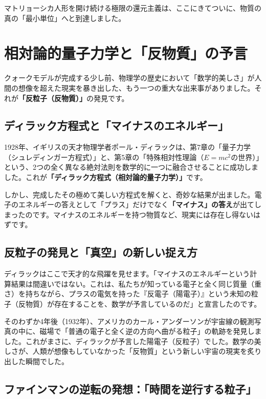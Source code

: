 マトリョーシカ人形を開け続ける極限の還元主義は、ここにきてついに、物質の真の「最小単位」へと到達しました。

\section{相対論的量子力学と「反物質」の予言}

クォークモデルが完成する少し前、物理学の歴史において「数学的美しさ」が人間の想像を超えた現実を暴き出した、もう一つの重大な出来事がありました。それが\textbf{「反粒子（反物質）」}の発見です。

\subsection{ディラック方程式と「マイナスのエネルギー」}

1928年、イギリスの天才物理学者ポール・ディラックは、第7章の「量子力学（シュレディンガー方程式）」と、第5章の「特殊相対性理論（\(E=mc^2\)の世界）」という、2つの全く異なる絶対法則を数学的に一つに融合させることに成功しました。これが\textbf{「ディラック方程式（相対論的量子力学）」}です。

しかし、完成したその極めて美しい方程式を解くと、奇妙な結果が出ました。電子のエネルギーの答えとして「プラス」だけでなく\textbf{「マイナス」の答え}が出てしまったのです。マイナスのエネルギーを持つ物質など、現実には存在し得ないはずです。

\subsection{反粒子の発見と「真空」の新しい捉え方}

ディラックはここで天才的な飛躍を見せます。「マイナスのエネルギーという計算結果は間違いではない。これは、私たちが知っている電子と全く同じ質量（重さ）を持ちながら、プラスの電気を持った『反電子（陽電子）』という未知の粒子（反物質）が存在することを、数学が予言しているのだ」と宣言したのです。

そのわずか4年後（1932年）、アメリカのカール・アンダーソンが宇宙線の観測写真の中に、磁場で「普通の電子と全く逆の方向へ曲がる粒子」の軌跡を発見しました。これがまさに、ディラックが予言した陽電子（反粒子）でした。数学の美しさが、人類が想像もしていなかった「反物質」という新しい宇宙の現実を炙り出した瞬間でした。

\subsection{ファインマンの逆転の発想：「時間を逆行する粒子」}

